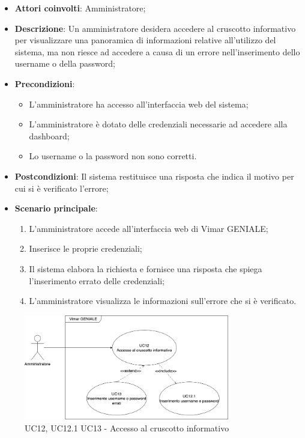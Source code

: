 \begin{itemize}
    \item \textbf{Attori coinvolti}: Amministratore;
    \item \textbf{Descrizione}: Un amministratore desidera accedere al cruscotto informativo per visualizzare una panoramica di informazioni relative all’utilizzo del sistema, ma non riesce ad accedere a causa di un errore nell’inserimento dello username o della password;
    \item \textbf{Precondizioni}: 
        \begin{itemize}
            \item L’amministratore ha accesso all’interfaccia web del sistema;
            \item L’amministratore è dotato delle credenziali necessarie ad accedere alla dashboard;
            \item Lo username o la password non sono corretti.
        \end{itemize}
    \item \textbf{Postcondizioni}: Il sistema restituisce una risposta che indica il motivo per cui si è verificato l’errore;
    \item \textbf{Scenario principale}:
    \begin{enumerate}
    \item L’amministratore accede all’interfaccia web di Vimar GENIALE;
    \item Inserisce le proprie credenziali;
    \item Il sistema elabora la richiesta e fornisce una risposta che spiega l’inserimento errato delle credenziali;
    \item L’amministratore visualizza le informazioni sull’errore che si è verificato.
    \end{enumerate}
\end{itemize}

\begin{figure}[H]
\centering
\includegraphics[width=0.8\textwidth]{contents/casi_duso/png/UC12.png}
\caption{UC12, UC12.1 UC13 - Accesso al cruscotto informativo }
\end{figure}

